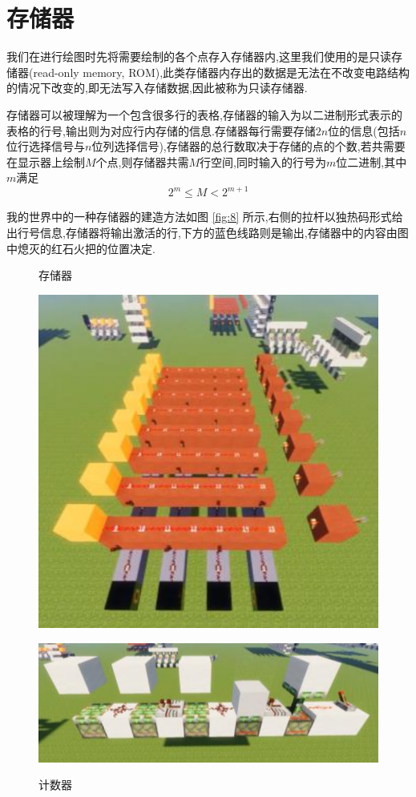 \documentclass[UTF8,12pt,punct=kaiming,fontset=none]{article}
\begin{document}
    \section{存储器}
    我们在进行绘图时先将需要绘制的各个点存入存储器内,这里我们使用的是只读存储器(read-only memory, ROM),此类存储器内存出的数据是无法在不改变电路结构的情况下改变的,即无法写入存储数据,因此被称为只读存储器.

    存储器可以被理解为一个包含很多行的表格,存储器的输入为以二进制形式表示的表格的行号,输出则为对应行内存储的信息.存储器每行需要存储$2 n$位的信息(包括$n$位行选择信号与$n$位列选择信号),存储器的总行数取决于存储的点的个数,若共需要在显示器上绘制$M$个点,则存储器共需$M$行空间,同时输入的行号为$m$位二进制,其中$m$满足
    $$2^m \leqslant M < 2^{m+1}$$

    我的世界中的一种存储器的建造方法如图 \ref{fig:8} 所示,右侧的拉杆以独热码形式给出行号信息,存储器将输出激活的行,下方的蓝色线路则是输出,存储器中的内容由图中熄灭的红石火把的位置决定.

    \begin{figure}[H]
        \begin{floatrow}
            \ffigbox
            {
                \caption{存储器}
                \label{fig:8}
            }
            {
                \includegraphics[width=0.5\linewidth]{figures/8.png}
            }
            \ffigbox
            {
                \caption{计数器}
                \label{fig:9}
            }
            {
                \includegraphics[width=\linewidth]{figures/9.png}
            }
        \end{floatrow}
    \end{figure}
\end{document}
